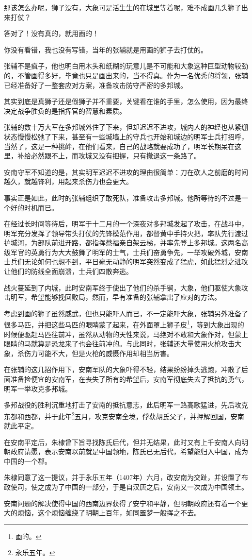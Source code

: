 \begin{multicols}{\theparacolNo}
那该怎么办呢，狮子没有，大象可是活生生的在城里等着呢，难不成画几头狮子出来打仗？

答对了！没有真的，就用画的！

你没有看错，我也没有写错，当年的张辅就是用画的狮子去打仗的。

张辅不是疯子，他也明白用木头和纸糊的玩意儿是不可能和大象这种巨型动物较劲的，不管画得多好，毕竟也只是画出来的，当不得真。作为一名优秀的将领，张辅已经准备好了一整套应对方案，准备攻击防守严密的多邦城。

其实到底是真狮子还是假狮子并不重要，关键看在谁的手里，怎么使用，因为最终决定战争胜负的是指挥官的智慧和素质。

张辅的数十万大军在多邦城外住了下来，但却迟迟不进攻，城内人的神经也从紧绷状态慢慢松弛了下来，甚至有一些城墙上的守兵也开始和城边的明军士兵打招呼，当然了，这是一种挑衅，在他们看来，自己的战略就要成功了，明军长期呆在这里，补给必然跟不上，而攻城又没有把握，只有撤退这一条路了。

安南守军不知道的是，其实明军迟迟不进攻的理由很简单：刀在砍人之前磨的时间越久，就越锋利，用起来杀伤力也会更大。

事实正是如此，此时的张辅组织了敢死队，准备攻击多邦城。他所等待的不过是一个好的时机而已。

在经过长时间等待后，明军于十二月的一个深夜对多邦城发起了攻击，在战斗中，明军充分发挥了领导带头打仗的先锋模范作用，都督黄中手持火把，率队先行渡过护城河，为部队前进开路，都指挥蔡福亲自架云梯，并率先登上多邦城。这两名高级军官的英勇行为大大鼓舞了明军的士气，士兵们奋勇争先，一举攻破外城，安南士兵们无论如何也想不到，平日毫无动静的明军突然变成了猛虎，如此猛烈之进攻让他们的防线全面崩溃，士兵们四散奔逃。

战火蔓延到了内城，此时安南军终于使出了他们的杀手锏，大象，他们驱使大象攻击明军，希望能够挽回败局，然而，早有准备的张辅拿出了应对的方法。

考虑到画的狮子虽然威武，但也只能吓人而已，不一定能吓大象，张辅另外准备了很多马匹，并把这些马匹的眼睛蒙了起来，在外面罩上狮子皮\footnote{画的。}，等到大象出现的时候便驱赶马匹往前冲，虽然从动物的天性来说，马绝对不敢和大象作对，但蒙上眼睛的马就算是恐龙来了也会往前冲的。与此同时，张辅还大量使用火枪攻击大象，杀伤力可能不大，但是火枪的威慑作用却相当厉害。

在张辅的这几招作用下，安南军队的大象吓得不轻，结果纷纷掉头逃跑，冲散了后面准备捡便宜的安南军，在丧失了所有的希望后，安南军彻底失去了抵抗的勇气，明军一举攻克多邦城。

多邦战役的胜利沉重地打击了安南的抵抗意志，此后明军一路高歌猛进，先后攻克东都和西都，并于此年\footnote{永乐五年。}五月，攻克安南全境，俘获胡氏父子，并押解回国，安南就此平定。

在安南平定后，朱棣曾下旨寻找陈氏后代，但并无结果，此时又有上千安南人向明朝政府请愿，表示安南以前就是中国领地，陈氏已无后代，希望能归入中国，成为中国的一个郡。

朱棣同意了这一提议，并于永乐五年（1407年）六月，改安南为交趾，并设置了布政使司，使之成为了中国的一部分，于是自汉唐之后，安南又一次成为中国领土。

安南问题的解决使得中国的西南边界获得了安宁和平静，但明朝政府还有着一个更大的烦恼，这个烦恼缠绕了明朝上百年，如同噩梦一般挥之不去。
\ifnum{}
	\end{multicols}
\fi
\newpage
